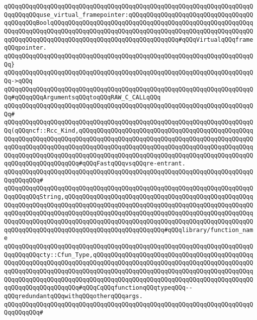\verb|qQQqqQQqqQQqqQQqqQQqqQQqqQQqqQQqqQQqqQQqqQQqqQQqqQQqqQQqqQQqqQQqqQQqqQQqqQQqqQQquse_virtual_framepointer:qQQqqQQqqQQqqQQqqQQqqQQqqQQqqQQqqQQqqQQqqQQqBoolqQQqqQQqqQQqqQQqqQQqqQQqqQQqqQQqqQQqqQQqqQQqqQQqqQQqqQQqqQQqqQQqqQQqqQQqqQQqqQQqqQQqqQQqqQQqqQQqqQQqqQQqqQQqqQQqqQQqqQQqqQQqqQQqqQQqqQQqqQQqqQQqqQQqqQQqqQQqqQQqqQQqqQQqqQQqqQQq#qQQqVirtualqQQqframeqQQqpointer.|\newline
\verb|qQQqqQQqqQQqqQQqqQQqqQQqqQQqqQQqqQQqqQQqqQQqqQQqqQQqqQQqqQQqqQQqqQQqqQQq}|\newline
\verb|qQQqqQQqqQQqqQQqqQQqqQQqqQQqqQQqqQQqqQQqqQQqqQQqqQQqqQQqqQQqqQQqqQQqqQQq->qQQq|\newline
\verb|qQQqqQQqqQQqqQQqqQQqqQQqqQQqqQQqqQQqqQQqqQQqqQQqqQQqqQQqqQQqqQQqqQQqqQQq#qQQqqQQqArgumentsqQQqtoqQQqRAW_C_CALLqQQq|\newline
\verb|qQQqqQQqqQQqqQQqqQQqqQQqqQQqqQQqqQQqqQQqqQQqqQQqqQQqqQQqqQQqqQQqqQQqqQQq#|\newline
\verb|qQQqqQQqqQQqqQQqqQQqqQQqqQQqqQQqqQQqqQQqqQQqqQQqqQQqqQQqqQQqqQQqqQQqqQQq(qQQqncf::Rcc_Kind,qQQqqQQqqQQqqQQqqQQqqQQqqQQqqQQqqQQqqQQqqQQqqQQqqQQqqQQqqQQqqQQqqQQqqQQqqQQqqQQqqQQqqQQqqQQqqQQqqQQqqQQqqQQqqQQqqQQqqQQqqQQqqQQqqQQqqQQqqQQqqQQqqQQqqQQqqQQqqQQqqQQqqQQqqQQqqQQqqQQqqQQqqQQqqQQqqQQqqQQqqQQqqQQqqQQqqQQqqQQqqQQqqQQqqQQqqQQqqQQqqQQqqQQqqQQqqQQqqQQqqQQqqQQqqQQqqQQqqQQq#qQQqFastqQQqvsqQQqre-entrant.|\newline
\verb|qQQqqQQqqQQqqQQqqQQqqQQqqQQqqQQqqQQqqQQqqQQqqQQqqQQqqQQqqQQqqQQqqQQqqQQqqQQqqQQq#|\newline
\verb|qQQqqQQqqQQqqQQqqQQqqQQqqQQqqQQqqQQqqQQqqQQqqQQqqQQqqQQqqQQqqQQqqQQqqQQqqQQqqQQqString,qQQqqQQqqQQqqQQqqQQqqQQqqQQqqQQqqQQqqQQqqQQqqQQqqQQqqQQqqQQqqQQqqQQqqQQqqQQqqQQqqQQqqQQqqQQqqQQqqQQqqQQqqQQqqQQqqQQqqQQqqQQqqQQqqQQqqQQqqQQqqQQqqQQqqQQqqQQqqQQqqQQqqQQqqQQqqQQqqQQqqQQqqQQqqQQqqQQqqQQqqQQqqQQqqQQqqQQqqQQqqQQqqQQqqQQqqQQqqQQqqQQqqQQqqQQqqQQqqQQqqQQqqQQqqQQqqQQqqQQqqQQqqQQqqQQqqQQqqQQqqQQqqQQq#qQQqlibrary/function_name|\newline
\verb|qQQqqQQqqQQqqQQqqQQqqQQqqQQqqQQqqQQqqQQqqQQqqQQqqQQqqQQqqQQqqQQqqQQqqQQqqQQqqQQqcty::Cfun_Type,qQQqqQQqqQQqqQQqqQQqqQQqqQQqqQQqqQQqqQQqqQQqqQQqqQQqqQQqqQQqqQQqqQQqqQQqqQQqqQQqqQQqqQQqqQQqqQQqqQQqqQQqqQQqqQQqqQQqqQQqqQQqqQQqqQQqqQQqqQQqqQQqqQQqqQQqqQQqqQQqqQQqqQQqqQQqqQQqqQQqqQQqqQQqqQQqqQQqqQQqqQQqqQQqqQQqqQQqqQQqqQQqqQQqqQQqqQQqqQQqqQQqqQQqqQQqqQQqqQQqqQQqqQQqqQQqqQQq#qQQqCqQQqfunctionqQQqtypeqQQq--qQQqredundantqQQqwithqQQqotherqQQqargs.|\newline
\verb|qQQqqQQqqQQqqQQqqQQqqQQqqQQqqQQqqQQqqQQqqQQqqQQqqQQqqQQqqQQqqQQqqQQqqQQqqQQqqQQq#|\newline
